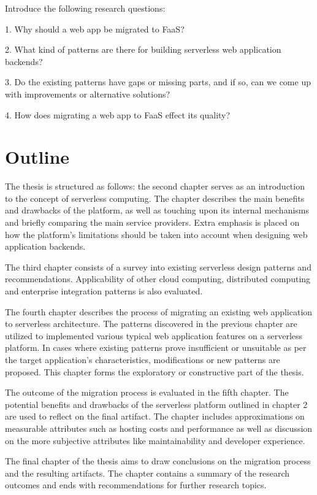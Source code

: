 \documentclass[utf8,english]{gradu3}
\begin{document}
Introduce the following research questions:

1. Why should a web app be migrated to FaaS?

2. What kind of patterns are there for building serverless web application backends?

3. Do the existing patterns have gaps or missing parts, and if so, can we come up with improvements or alternative solutions?

4. How does migrating a web app to FaaS effect its quality?

\section{Outline}

The thesis is structured as follows: the second chapter serves as an introduction to the concept of serverless computing. The chapter describes the main benefits and drawbacks of the platform, as well as touching upon its internal mechanisms and briefly comparing the main service providers. Extra emphasis is placed on how the platform's limitations should be taken into account when designing web application backends.

The third chapter consists of a survey into existing serverless design patterns and recommendations. Applicability of other cloud computing, distributed computing and enterprise integration patterns is also evaluated.

The fourth chapter describes the process of migrating an existing web application to serverless architecture. The patterns discovered in the previous chapter are utilized to implemented various typical web application features on a serverless platform. In cases where existing patterns prove insufficient or unsuitable as per the target application's characteristics, modifications or new patterns are proposed. This chapter forms the exploratory or constructive part of the thesis.

The outcome of the migration process is evaluated in the fifth chapter. The potential benefits and drawbacks of the serverless platform outlined in chapter 2 are used to reflect on the final artifact. The chapter includes approximations on measurable attributes such as hosting costs and performance as well as discussion on the more subjective attributes like maintainability and developer experience.

The final chapter of the thesis aims to draw conclusions on the migration process and the resulting artifacts. The chapter contains a summary of the research outcomes and ends with recommendations for further research topics.
\end{document}
